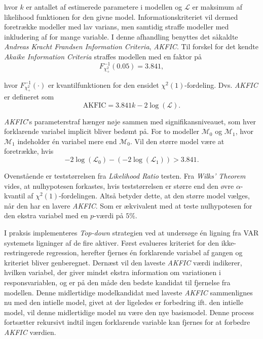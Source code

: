 \documentclass[
  a4paper,
  oneside]{memoir}
\begin{document}
hvor \(k\) er antallet af estimerede parametere i modellen og \(\mathcal{L}\) er maksimum af likelihood funktionen for den givne model. Informationskriteriet vil dermed foretrække modeller med lav varians, men samtidig straffe modeller med inkludering af for mange variable. I denne afhandling benyttes det såkaldte \emph{Andreas Kracht Frandsen Information Criteria}, \emph{AKFIC}. Til forskel for det kendte \emph{Akaike Information Criteria} straffes modellen med en faktor på
\[F^{-1}_{\chi_{+}^2}(0.05)=3.841,\]

hvor \(F^{-1}_{\chi_{+}^2}(\cdot)\) er kvantilfunktionen for den ensidet \(\chi^2(1)\)-fordeling. Dvs. \emph{AKFIC} er defineret som
\[\text{AKFIC}=3.841 k-2\log(\mathcal{L}).\]

\emph{AKFIC}'s parameterstraf hænger nøje sammen med signifikansniveauet, som hver forklarende variabel implicit bliver bedømt på. For to modeller \(\mathcal{M}_0\) og \(\mathcal{M}_1\), hvor \(\mathcal{M}_1\) indeholder én variabel mere end \(\mathcal{M}_0\). Vil den større model være at foretrække, hvis
\[-2\log(\mathcal{L}_0)-(-2\log(\mathcal{L}_1))>3.841.\]

Ovenstående er teststørrelsen fra \emph{Likelihood Ratio} testen. Fra \emph{Wilks' Theorem} vides, at nulhypotesen forkastes, hvis teststørrelsen er større end den øvre \(\alpha\)-kvantil af \(\chi^2(1)\)-fordelingen. Altså betyder dette, at den større model vælges, når den har en lavere \emph{AKFIC}. Som er ækvivalent med at teste nulhypotesen for den ekstra variabel med en \(p\)-værdi på \(5\%\).

I praksis implementeres \emph{Top-down} strategien ved at undersøge én ligning fra VAR systemets ligninger af de fire aktiver. Først evalueres kriteriet for den ikke-restringerede regression, herefter fjernes én forklarende variabel af gangen og kriteriet bliver genberegnet. Dernæst vil den laveste \emph{AKFIC} værdi indikerer, hvilken variabel, der giver mindst ekstra information om variationen i responsvariablen, og er på den måde den bedste kandidat til fjernelse fra modellen. Denne midlertidige modelkandidat med laveste \emph{AKFIC} sammenlignes nu med den intielle model, givet at der ligeledes er forbedring ift. den intielle model, vil denne midlertidige model nu være den nye basismodel. Denne process fortsætter rekursivt indtil ingen forklarende variable kan fjernes for at forbedre \emph{AKFIC} værdien.
\end{document}
